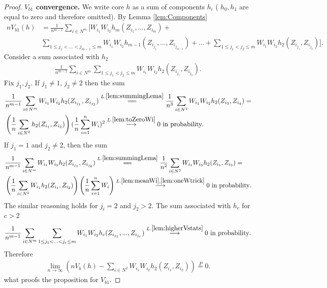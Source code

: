 \documentclass{article} %
\begin{document}
\begin{proof}
\textbf{$V_{b1}$ convergence.} We write core  $h$ as a sum of components $h_i$ ( $h_0,h_1$ are equal to zero and therefore omitted). By Lemma \ref{lem:Components}
\begin{align}
\label{eq:bootstrapedOne}
 n V_{b1}(h)& = \frac{1} {n^{m-1}}  \sum_{i \in N^m}  \Big[ W_{i_1} W_{i_2}   h_m(Z_{i_1},...,Z_{i_m})  + \\ 
 & \sum_{1 \leq j_1 < ...<j_{m-1} \leq m } W_{i_1} W_{i_2} h_{m-1}(Z_{i_{j_1}},...,Z_{i_{j_{m-1}}})   + ... + \sum_{1 \leq j_1 < j_2 \leq m } W_{i_1} W_{i_2} h_2(Z_{i_{j_1}},Z_{i_{j_2}}) \Big].
\end{align}
Consider a sum associated with $h_2$
\begin{align}
\frac{1} {n^{m-1}}  \sum_{i \in N^m}  \sum_{1 \leq j_1 < j_2 \leq m } W_{i_1} W_{i_2} h_2(Z_{i_{j_1}},Z_{i_{j_2}}).
\end{align}
Fix $j_1,j_2$. If $j_1 \neq 1$,  $j_2 \neq 2$ then the sum 
\begin{align}
\label{eq:difference}
&\frac{1} {n^{m-1}}  \sum_{i \in N^m}   W_{i_1} W_{i_2} h_2(Z_{i_{j_1}},Z_{i_{j_2}}) \overset{L.\ref{lem:summingLema}}{=\joinrel=}   \frac{1} {n^3}  \sum_{i \in N^4}   W_{i_1} W_{i_2} h_2(Z_{i_3},Z_{i_4}) = \\
& \left( \frac{1}{n}   \sum_{ i \in N^2} h_2(Z_{i_1},Z_{i_2}) \right) (\frac{1}{n} \sum_{i=1}^{n}W_i)^2 \overset{L. \ref{lem:toZeroWi}}{\longrightarrow} 0 \text{ in probability}.  
\end{align}
If $j_1 = 1$ and  $j_2 \neq 2$, then the sum  
\begin{align}
\label{eq:h2eq1}
&\frac{1} {n^{m-1}}  \sum_{i \in N^m}  W_{i_1} W_{i_2} h_2(Z_{i_{j_1}},Z_{i_{j_2}})  \overset{L.\ref{lem:summingLema}}{=\joinrel=} \frac{1} {n^2}  \sum_{i \in N^3}   W_{i_1} W_{i_3} h_2(Z_{i_1},Z_{i_3}) = \\
& \left( \frac{1}{n} \sum_{i \in N^2} W_{i_1}  h_2(Z_{i_1},Z_{i_2}) \right) \left( \frac 1 n \sum_{i=1}^{n}W_i \right) \overset{L.\ref{lem:meanWi},\ref{lem:oneWtrick}  }{\longrightarrow} 0 \text{ in probability}.
\end{align}
The similar reasoning holds for $j_i=2$ and $j_2>2$. The sum associated with $h_c$ for $c>2$
\begin{align}
\frac{1} {n^{m-1}}  \sum_{i \in N^m}  \sum_{1 \leq j_1 < ... < j_c \leq m } W_{i_1} W_{i_2} h_c(Z_{i_{j_1}},...,Z_{i_{j_c}}) \overset{L. \ref{lem:higherVstats}  }{\longrightarrow} 0  \text{ in probability}.
\end{align}
Therefore 
\begin{align}
\lim_{n \to \infty} \left( n V_b(h) - \sum_{i \in N^2} W_{i_1}W_{i_2} h_2(Z_{i_1},Z_{i_2}) \right) \overset{P}{=}0.
\end{align}
what proofs the proposition for $V_{b1}$.



\end{proof}
\end{document}
